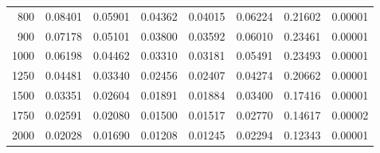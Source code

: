 \begin{table}[ht]
\begin{tabular}{r|c|c|c|c|c|c|c}
      800 & 0.08401 & 0.05901 & 0.04362 & 0.04015 & 0.06224 & 0.21602 & 0.00001 \\
      900 & 0.07178 & 0.05101 & 0.03800 & 0.03592 & 0.06010 & 0.23461 & 0.00001 \\
     1000 & 0.06198 & 0.04462 & 0.03310 & 0.03181 & 0.05491 & 0.23493 & 0.00001 \\
     1250 & 0.04481 & 0.03340 & 0.02456 & 0.02407 & 0.04274 & 0.20662 & 0.00001 \\
     1500 & 0.03351 & 0.02604 & 0.01891 & 0.01884 & 0.03400 & 0.17416 & 0.00001 \\
     1750 & 0.02591 & 0.02080 & 0.01500 & 0.01517 & 0.02770 & 0.14617 & 0.00002 \\
     2000 & 0.02028 & 0.01690 & 0.01208 & 0.01245 & 0.02294 & 0.12343 & 0.00001 \\ \cline{1-8}
    \end{tabular}
    \label{tab:XRayEffODE3}
\end{table}

